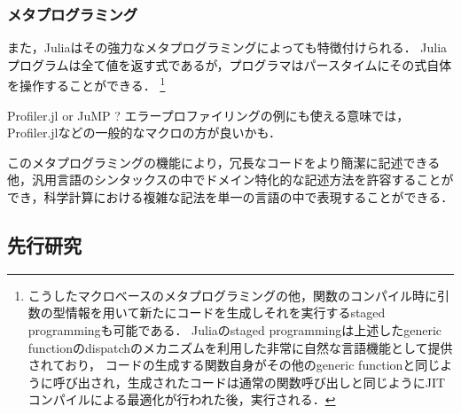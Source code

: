 \subsubsection{メタプログラミング}

また，Juliaはその強力なメタプログラミングによっても特徴付けられる．
Juliaプログラムは全て値を返す式であるが，プログラマはパースタイムにその式自体を操作することができる．
\footnote{
  こうしたマクロベースのメタプログラミングの他，関数のコンパイル時に引数の型情報を用いて新たにコードを生成しそれを実行するstaged programmingも可能である．
  Juliaのstaged programmingは上述したgeneric functionのdispatchのメカニズムを利用した非常に自然な言語機能として提供されており，
  コードの生成する関数自身がその他のgeneric functionと同じように呼び出され，生成されたコードは通常の関数呼び出しと同じようにJITコンパイルによる最適化が行われた後，実行される．
}

Profiler.jl or JuMP ?
エラープロファイリングの例にも使える意味では，Profiler.jlなどの一般的なマクロの方が良いかも．

このメタプログラミングの機能により，冗長なコードをより簡潔に記述できる他，汎用言語のシンタックスの中でドメイン特化的な記述方法を許容することができ，科学計算における複雑な記法を単一の言語の中で表現することができる\cite{jeff-phd}\cite{DunningHuchetteLubin2017}．



\subsection{先行研究}

